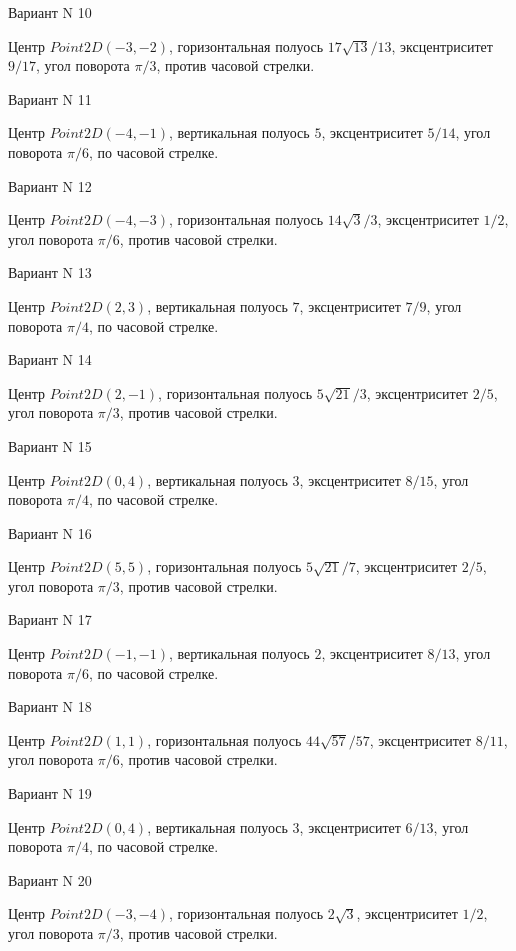 \documentclass[11pt]{report}
\begin{document}
Вариант N 10

Центр $Point2D\left(-3, -2\right)$, горизонтальная полуось $17 \sqrt{13} / 13$, эксцентриситет $9 / 17$, угол поворота $\pi / 3$, против часовой стрелки.

Вариант N 11

Центр $Point2D\left(-4, -1\right)$, вертикальная полуось $5$, эксцентриситет $5 / 14$, угол поворота $\pi / 6$, по часовой стрелке.

Вариант N 12

Центр $Point2D\left(-4, -3\right)$, горизонтальная полуось $14 \sqrt{3} / 3$, эксцентриситет $1 / 2$, угол поворота $\pi / 6$, против часовой стрелки.

Вариант N 13

Центр $Point2D\left(2, 3\right)$, вертикальная полуось $7$, эксцентриситет $7 / 9$, угол поворота $\pi / 4$, по часовой стрелке.

Вариант N 14

Центр $Point2D\left(2, -1\right)$, горизонтальная полуось $5 \sqrt{21} / 3$, эксцентриситет $2 / 5$, угол поворота $\pi / 3$, против часовой стрелки.

Вариант N 15

Центр $Point2D\left(0, 4\right)$, вертикальная полуось $3$, эксцентриситет $8 / 15$, угол поворота $\pi / 4$, по часовой стрелке.

Вариант N 16

Центр $Point2D\left(5, 5\right)$, горизонтальная полуось $5 \sqrt{21} / 7$, эксцентриситет $2 / 5$, угол поворота $\pi / 3$, против часовой стрелки.

Вариант N 17

Центр $Point2D\left(-1, -1\right)$, вертикальная полуось $2$, эксцентриситет $8 / 13$, угол поворота $\pi / 6$, по часовой стрелке.

Вариант N 18

Центр $Point2D\left(1, 1\right)$, горизонтальная полуось $44 \sqrt{57} / 57$, эксцентриситет $8 / 11$, угол поворота $\pi / 6$, против часовой стрелки.

Вариант N 19

Центр $Point2D\left(0, 4\right)$, вертикальная полуось $3$, эксцентриситет $6 / 13$, угол поворота $\pi / 4$, по часовой стрелке.

Вариант N 20

Центр $Point2D\left(-3, -4\right)$, горизонтальная полуось $2 \sqrt{3}$, эксцентриситет $1 / 2$, угол поворота $\pi / 3$, против часовой стрелки.
\end{document}
